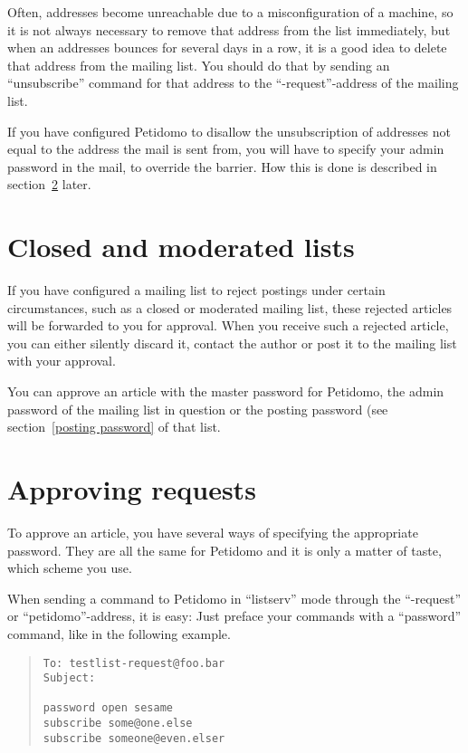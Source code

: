 \documentclass[a4paper,10pt]{scrreprt}
\begin{document}
Often, addresses become unreachable due to a misconfiguration of a
machine, so it is not always necessary to remove that address from the
list immediately, but when an addresses bounces for several days in a
row, it is a good idea to delete that address from the mailing list.
You should do that by sending an ``unsubscribe'' command for that
address to the ``-request''-address of the mailing list.

If you have configured Petidomo to disallow the unsubscription of
addresses not equal to the address the mail is sent from, you will
have to specify your admin password in the mail, to override the
barrier. How this is done is described in section~\ref{approve} later.

\section{Closed and moderated lists}

If you have configured a mailing list to reject postings under certain
circumstances, such as a closed or moderated mailing list, these
rejected articles will be forwarded to you for approval. When you
receive such a rejected article, you can either silently
discard it, contact the author or post it to the mailing list with
your approval.

You can approve an article with the master password for Petidomo, the
admin password of the mailing list in question or the posting password
(see section~\ref{posting password} of that list.

\section{Approving requests}
\label{approve}

To approve an article, you have several ways of specifying the
appropriate password. They are all the same for Petidomo and it is
only a matter of taste, which scheme you use.

When sending a command to Petidomo in ``listserv'' mode through the
``-request'' or ``petidomo''-address, it is easy: Just preface your
commands with a ``password'' command, like in the following example.
\begin{quote}
\begin{verbatim}
To: testlist-request@foo.bar
Subject:

password open sesame
subscribe some@one.else
subscribe someone@even.elser
\end{verbatim}
\end{quote}
\end{document}

